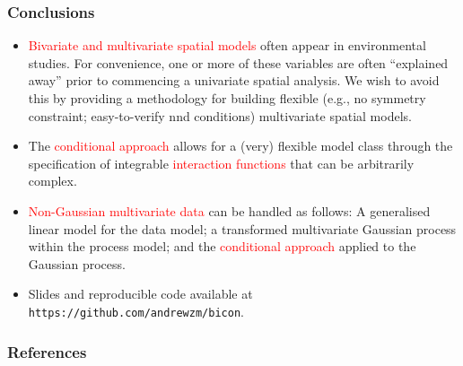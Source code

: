 \documentclass{beamer}
\begin{document}
\begin{frame}
\frametitle{Conclusions}
\vspace{-.8cm}
\begin{itemize}
\item \textcolor{red}{Bivariate and multivariate spatial models} often appear in environmental studies. For convenience, one or more of these variables are often ``explained away'' prior to commencing a univariate spatial analysis. We wish to avoid this by providing a methodology for building flexible (e.g., no symmetry constraint; easy-to-verify nnd conditions) multivariate spatial models.
\item The \textcolor{red}{conditional approach} allows for a (very) flexible model class through the specification of integrable \textcolor{red}{interaction functions} that can be arbitrarily complex.
\item \textcolor{red}{Non-Gaussian multivariate data} can be handled as follows: A generalised linear model for the data model;  a transformed multivariate Gaussian process within the process model; and the \textcolor{red}{conditional approach} applied to the Gaussian process.
\item Slides and reproducible code available at \texttt{https://github.com/andrewzm/bicon}.
\end{itemize}
\end{frame}

\small

\begin{frame}[allowframebreaks]
\frametitle{References}


\vspace{-1cm}



\end{frame}
\end{document}
